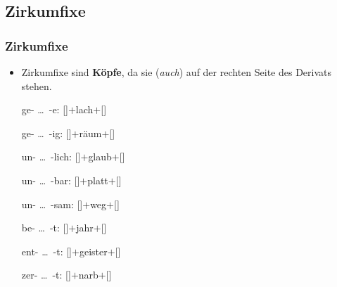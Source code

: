 \subsection{Zirkumfixe}
\begin{frame}
\frametitle{Zirkumfixe}

\begin{itemize}
	\item Zirkumfixe sind \textbf{Köpfe}, da sie (\emph{auch}) auf der rechten Seite des Derivats stehen.
	
	\ea
	\ea ge- \dots\ -e: []$+$lach$+$[]
	
	\ex ge- \dots\ -ig: []$+$räum$+$[]
	
	\ex un- \dots\ -lich: []$+$glaub$+$[]
	
	\ex un- \dots\ -bar: []$+$platt$+$[]
	
	\ex un- \dots\ -sam: 
	[]$+$weg$+$[]
	
	\ex be- \dots\ -t: 
	[]$+$jahr$+$[]
	
	\ex ent- \dots\ -t: 
	[]$+$geister$+$[]		
	
	\ex zer- \dots\ -t: 
	[]$+$narb$+$[]		
	\z 
	\z
\end{itemize}

\end{frame}


